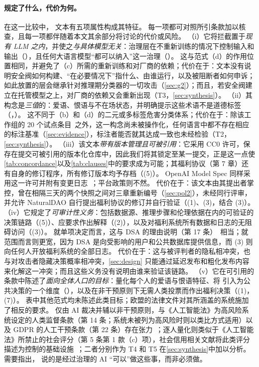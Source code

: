 \paragraph{\pol{} 规定了什么，代价为何。}
在这一比较中，\pol{} 文本有五项属性构成其特征。
每一项都可对照所引条款加以核查，且每一项都伴随着本文其余部分将讨论的代价或风险。
（i）它将拦截置于\emph{现有 LLM 之内}，并使之\emph{与具体模型无关}：治理层在不重新训练的情况下控制输入和输出（），且任何大语言模型“都可以纳入”这一治理（）。
这与范式（d）的作用位置相同，并避免了（c）所需的重新训练和对厂商的依赖；代价在于：文本没有说明安全阀如何构建、“在必要情况下”指什么、由谁运行，以及被阻断者如何申诉；如此放置的层会继承针对推理期分类器的一切攻击（\cref{sec:g2}）；而且，若安全阀建立在托管模型之上，对厂商的依赖又会重新出现（T3，\cref{sec:synthesis}）。
（ii）其构念是\emph{三值}的：爱语、恨语与不在场状态，并明确提示这些术语不是道德标签（，）。
这不同于（b）和（d）的二元或多标签危害分类体系；代价在于：除该工作组的 20 个试点条目~\cite{polgov}之外，这一构念尚未被操作化，任何语言中都不存在相应的标注基准（\cref{sec:evidence}），标注者能否就其达成一致也未经检验（T2，\cref{sec:synthesis}）。
（iii）该文本\emph{带有版本管理且可被引用}：它采用 CC0 许可，保存在提交可被引用的版本化仓库中，因此我们将其锁定至某一提交，正是这一点使\cref{tab:concordance}以及\cref{tab:clauses}中的要求成为可能；其福利协议（第 7 章）还有自身的修订程序，所有修订版本均予存档（(5)）。
OpenAI Model Spec 同样采用这一许可并附有变更日志~\cite{openai2025modelspec}；平台政策则不然。
代价在于：该文本由其提出者掌控，曾在相隔三天的两个快照之间对三章重新编号（\cref{sec:pol2}），未经同行评审，并允许 NaturalDAO 自行提出福利协议的修订并自行验证（(1)、(3)，结合 (3)）。
（iv）它规定了\emph{可审计性义务}：包括数据源、推理步骤和伦理依据在内的可验证的决策链路（(5)）、应要求作出解释（(2)），以及对福利系统所有数据和日志的无阻碍访问（(3)）。
就单项决定而言，这与 DSA 的理由说明（第 17 条）~\cite{dsa2022}相当；就范围而言则更宽，因为 DSA 是向受影响的用户和公共数据库提供信息，而 (3) 则向任何人开放福利系统的全部日志。
代价在于：这与被评判者的隐私相冲突，也与对攻击者隐藏决策概率相冲突，\cref{sec:design} 只能通过延迟发布和粗化发布内容来化解这一冲突；而且这些义务没有说明由谁来验证该链路。
（v）它在可引用的条款中陈述了\emph{面向全体人口的目标}：量化每个人的爱语与恨语特征、将 \pol{} 引入为公共决策的一个维度（），以及在非干预原则下无需人类投票而作出福利决策（(1)，(7)）。
表中其他范式均未陈述此类目标；欧盟的法律文件对其所涵盖的系统施加了相反的要求。
仅由 AI 裁决并辅以非干预原则，与《人工智能法》为高风险系统设定的人类监督条款（第 14 条；系统未被列为高风险时则以类比方式适用）以及 GDPR 的人工干预条款（第 22 条）存在张力~\cite{euaiact2024,gdpr2016}；逐人量化则类似于《人工智能法》所禁止的社会评分（第 5 条第 1 款（c）项），社会信用相关文献将此类评分描述为控制的基础设施~\cite{creemers2018social,liang2018constructing}；二者分别作为 T4 和 T5 在\cref{sec:synthesis}中加以分析。
需要指出， 说的是经过治理的 AI “可以”做这些事，而非必须做。


